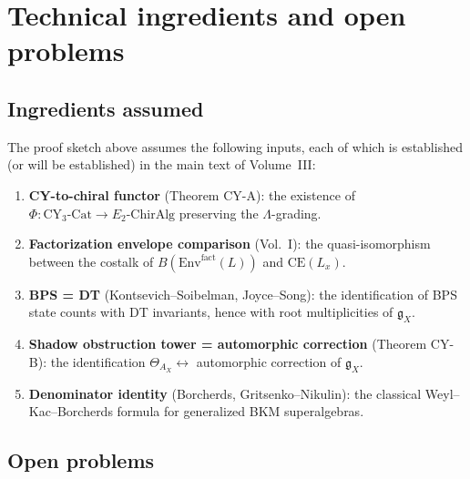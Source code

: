\documentclass[11pt]{article}
\theoremstyle{definition}
\theoremstyle{remark}
\newcommand{\frakg}{\mathfrak{g}}
\begin{document}
\section{Technical ingredients and open problems}
\label{sec:technical}

\subsection{Ingredients assumed}

The proof sketch above assumes the following inputs, each of which is
established (or will be established) in the main text of Volume~III:

\begin{enumerate}[label=(I\arabic*)]
\item \textbf{CY-to-chiral functor} (Theorem CY-A): the existence
 of $\Phi \colon \mathrm{CY}_3\text{-}\mathrm{Cat} \to
 E_2\text{-}\mathrm{ChirAlg}$ preserving the $\Lambda$-grading.

\item \textbf{Factorization envelope comparison} (Vol.~I): the
 quasi-isomorphism between the costalk of $B(\mathrm{Env}^{\mathrm{fact}}(L))$
 and $\mathrm{CE}(L_x)$.

\item \textbf{BPS = DT} (Kontsevich--Soibelman, Joyce--Song): the
 identification of BPS state counts with DT invariants, hence with
 root multiplicities of $\frakg_X$.

\item \textbf{Shadow obstruction tower = automorphic correction} (Theorem CY-B):
 the identification $\Theta_{A_X} \leftrightarrow$ automorphic
 correction of $\frakg_X$.

\item \textbf{Denominator identity} (Borcherds, Gritsenko--Nikulin):
 the classical Weyl--Kac--Borcherds formula for generalized BKM
 superalgebras.
\end{enumerate}

\subsection{Open problems}
\end{document}

